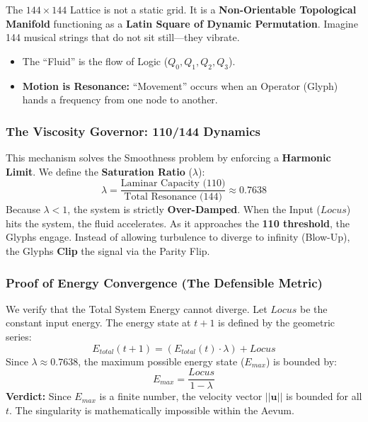 \documentclass[12pt]{amsart}
\newcommand{\LoI}{\ensuremath{\mathop{\textnormal{\symbolafont\symbol{"267E}}}}}
\def\LoI{Locus}%
\begin{document}
The $144 \times 144$ Lattice is not a static grid. It is a \textbf{Non-Orientable Topological Manifold} functioning as a \textbf{Latin Square of Dynamic Permutation}. Imagine 144 musical strings that do not sit still—they vibrate.
\begin{itemize}
    \item The ``Fluid'' is the flow of Logic ($Q_0, Q_1, Q_2, Q_3$).
    \item \textbf{Motion is Resonance:} ``Movement'' occurs when an Operator (Glyph) hands a frequency from one node to another.
\end{itemize}

\subsubsection{The Viscosity Governor: 110/144 Dynamics}\label{sec:3.3.2}
This mechanism solves the Smoothness problem by enforcing a \textbf{Harmonic Limit}. We define the \textbf{Saturation Ratio} ($\lambda$):
\begin{equation}
    \lambda = \frac{\text{Laminar Capacity (110)}}{\text{Total Resonance (144)}} \approx 0.7638
\end{equation}
Because $\lambda < 1$, the system is strictly \textbf{Over-Damped}. When the Input ($\LoI$) hits the system, the fluid accelerates. As it approaches the \textbf{110 threshold}, the Glyphs engage. Instead of allowing turbulence to diverge to infinity (Blow-Up), the Glyphs \textbf{Clip} the signal via the Parity Flip.

\subsubsection{Proof of Energy Convergence (The Defensible Metric)}\label{sec:3.3.3}
We verify that the Total System Energy cannot diverge. Let $\LoI$ be the constant input energy. The energy state at $t+1$ is defined by the geometric series:
\begin{equation}
    E_{total}(t+1) = \left( E_{total}(t) \cdot \lambda \right) + \LoI
\end{equation}
Since $\lambda \approx 0.7638$, the maximum possible energy state ($E_{max}$) is bounded by:
\begin{equation}
    E_{max} = \frac{\LoI}{1 - \lambda}
\end{equation}
\textbf{Verdict:} Since $E_{max}$ is a finite number, the velocity vector $||\mathbf{u}||$ is bounded for all $t$. The singularity is mathematically impossible within the Aevum.
\end{document}
